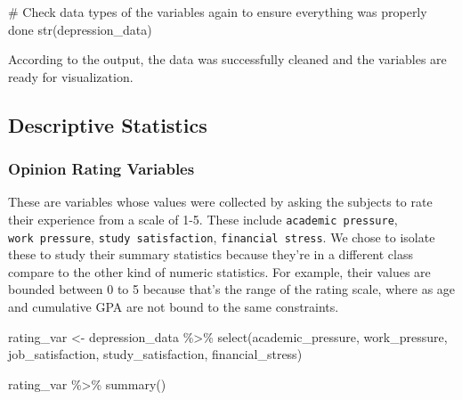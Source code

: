 \documentclass[
  letterpaper,
  DIV=11,
  numbers=noendperiod]{scrartcl}
\newenvironment{Shaded}{\begin{snugshade}}{\end{snugshade}}
\newcommand{\CommentTok}[1]{\textcolor[rgb]{0.37,0.37,0.37}{#1}}
\newcommand{\FunctionTok}[1]{\textcolor[rgb]{0.28,0.35,0.67}{#1}}
\newcommand{\NormalTok}[1]{\textcolor[rgb]{0.00,0.23,0.31}{#1}}
\newcommand{\OtherTok}[1]{\textcolor[rgb]{0.00,0.23,0.31}{#1}}
\newcommand{\SpecialCharTok}[1]{\textcolor[rgb]{0.37,0.37,0.37}{#1}}
\begin{document}
\begin{Shaded}
\begin{Highlighting}[numbers=left,,]
\CommentTok{\# Check data types of the variables again to ensure everything was properly done}
\FunctionTok{str}\NormalTok{(depression\_data)}
\end{Highlighting}
\end{Shaded}

According to the output, the data was successfully cleaned and the
variables are ready for visualization.

\subsection{Descriptive Statistics}\label{descriptive-statistics}

\subsubsection{Opinion Rating Variables}\label{opinion-rating-variables}

These are variables whose values were collected by asking the subjects
to rate their experience from a scale of 1-5. These include
\texttt{academic\ pressure}, \texttt{work\ pressure},
\texttt{study\ satisfaction}, \texttt{financial\ stress}. We chose to
isolate these to study their summary statistics because they're in a
different class compare to the other kind of numeric statistics. For
example, their values are bounded between 0 to 5 because that's the
range of the rating scale, where as age and cumulative GPA are not bound
to the same constraints.

\begin{Shaded}
\begin{Highlighting}[numbers=left,,]
\NormalTok{rating\_var }\OtherTok{\textless{}{-}}\NormalTok{ depression\_data }\SpecialCharTok{\%\textgreater{}\%} 
  \FunctionTok{select}\NormalTok{(academic\_pressure, work\_pressure, job\_satisfaction, study\_satisfaction, financial\_stress)}
\end{Highlighting}
\end{Shaded}

\begin{Shaded}
\begin{Highlighting}[numbers=left,,]
\NormalTok{rating\_var }\SpecialCharTok{\%\textgreater{}\%} \FunctionTok{summary}\NormalTok{()}
\end{Highlighting}
\end{Shaded}
\end{document}
